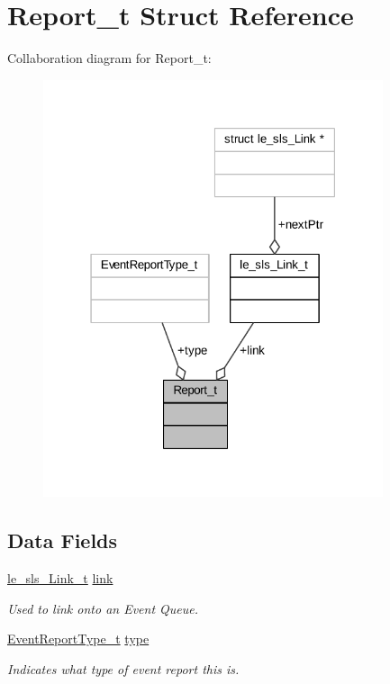 \hypertarget{struct_report__t}{}\section{Report\+\_\+t Struct Reference}
\label{struct_report__t}


Collaboration diagram for Report\+\_\+t\+:
\nopagebreak
\begin{figure}[H]
\begin{center}
\leavevmode
\includegraphics[width=283pt]{struct_report__t__coll__graph}
\end{center}
\end{figure}
\subsection*{Data Fields}
\begin{DoxyCompactItemize}
\item 
\hyperlink{structle__sls___link__t}{le\+\_\+sls\+\_\+\+Link\+\_\+t} \hyperlink{struct_report__t_a4205401a86f97b70d37377e00f23e616}{link}
\begin{DoxyCompactList}\small\item\em Used to link onto an Event Queue. \end{DoxyCompactList}\item 
\hyperlink{event_loop_8c_a6aa6009a5d10e60073e8a02b4d55823a}{Event\+Report\+Type\+\_\+t} \hyperlink{struct_report__t_a24c836d3a3e92bfcdc6914eacd76d5e9}{type}
\begin{DoxyCompactList}\small\item\em Indicates what type of event report this is. \end{DoxyCompactList}\end{DoxyCompactItemize}


